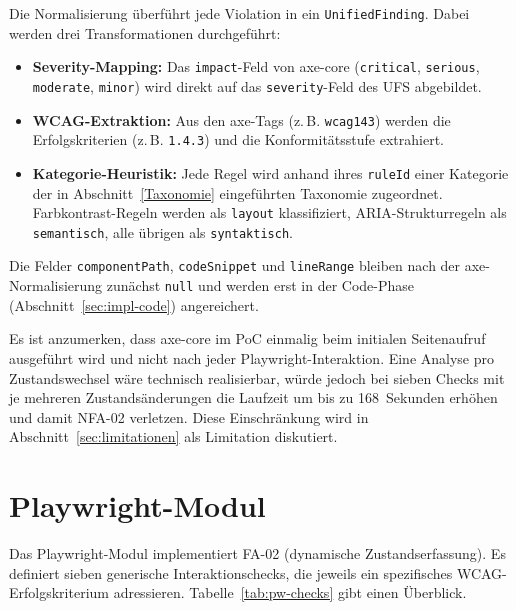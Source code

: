 Die Normalisierung überführt jede Violation in ein \texttt{UnifiedFinding}. Dabei werden drei Transformationen durchgeführt:

\begin{itemize}
  \item \textbf{Severity-Mapping:} Das \texttt{impact}-Feld von axe-core (\texttt{critical}, \texttt{serious}, \texttt{moderate}, \texttt{minor}) wird direkt auf das \texttt{severity}-Feld des \ac{UFS} abgebildet.
  \item \textbf{WCAG-Extraktion:} Aus den axe-Tags (z.\,B. \texttt{wcag143}) werden die Erfolgskriterien (z.\,B. \texttt{1.4.3}) und die Konformitätsstufe extrahiert.
  \item \textbf{Kategorie-Heuristik:} Jede Regel wird anhand ihres \texttt{ruleId} einer Kategorie der in Abschnitt~\ref{Taxonomie} eingeführten Taxonomie zugeordnet. Farbkontrast-Regeln werden als \texttt{layout} klassifiziert, ARIA-Strukturregeln als \texttt{semantisch}, alle übrigen als \texttt{syntaktisch}.
\end{itemize}

Die Felder \texttt{componentPath}, \texttt{codeSnippet} und \texttt{lineRange} bleiben nach der axe-Normalisierung zunächst \texttt{null} und werden erst in der Code-Phase (Abschnitt~\ref{sec:impl-code}) angereichert.

Es ist anzumerken, dass axe-core im \ac{PoC} einmalig beim initialen Seitenaufruf ausgeführt wird und nicht nach jeder Playwright-Interaktion. Eine Analyse pro Zustandswechsel wäre technisch realisierbar, würde jedoch bei sieben Checks mit je mehreren Zustandsänderungen die Laufzeit um bis zu 168~Sekunden erhöhen und damit \ac{NFA}-02 verletzen. Diese Einschränkung wird in Abschnitt~\ref{sec:limitationen} als Limitation diskutiert.

\section{Playwright-Modul}
\label{sec:impl-pw}

Das Playwright-Modul implementiert \ac{FA}-02 (dynamische Zustandserfassung). Es definiert sieben generische Interaktionschecks, die jeweils ein spezifisches \ac{WCAG}-Erfolgskriterium adressieren. Tabelle~\ref{tab:pw-checks} gibt einen Überblick.


